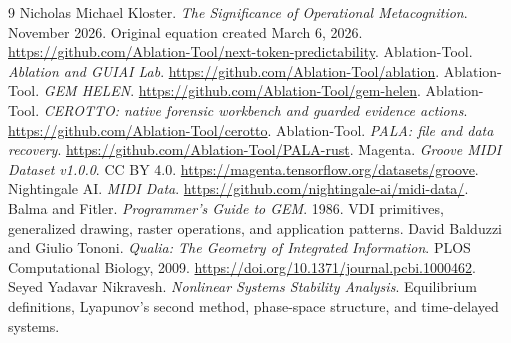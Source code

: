 \documentclass[11pt,a4paper]{article}
\begin{document}
\begin{thebibliography}{9}
Nicholas Michael Kloster. \emph{The Significance of Operational Metacognition}. November 2026. Original equation created March 6, 2026. \url{https://github.com/Ablation-Tool/next-token-predictability}.
Ablation-Tool. \emph{Ablation and GUIAI Lab}. \url{https://github.com/Ablation-Tool/ablation}.
Ablation-Tool. \emph{GEM HELEN}. \url{https://github.com/Ablation-Tool/gem-helen}.
Ablation-Tool. \emph{CEROTTO: native forensic workbench and guarded evidence actions}. \url{https://github.com/Ablation-Tool/cerotto}.
Ablation-Tool. \emph{PALA: file and data recovery}. \url{https://github.com/Ablation-Tool/PALA-rust}.
Magenta. \emph{Groove MIDI Dataset v1.0.0}. CC BY 4.0. \url{https://magenta.tensorflow.org/datasets/groove}.
Nightingale AI. \emph{MIDI Data}. \url{https://github.com/nightingale-ai/midi-data/}.
Balma and Fitler. \emph{Programmer's Guide to GEM}. 1986. VDI primitives, generalized drawing, raster operations, and application patterns.
David Balduzzi and Giulio Tononi. \emph{Qualia: The Geometry of Integrated Information}. PLOS Computational Biology, 2009. \url{https://doi.org/10.1371/journal.pcbi.1000462}.
Seyed Yadavar Nikravesh. \emph{Nonlinear Systems Stability Analysis}. Equilibrium definitions, Lyapunov's second method, phase-space structure, and time-delayed systems.
\end{thebibliography}
\end{document}

